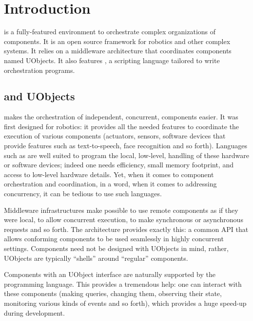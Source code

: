
\chapter{Introduction}

\usdk is a fully-featured environment to orchestrate complex organizations
of components.  It is an open source framework for robotics and other
complex systems.  It relies on a middleware architecture that coordinates
components named UObjects.  It also features \us, a scripting language
tailored to write orchestration programs.

\section{\urbi and UObjects}

\urbi makes the orchestration of independent, concurrent, components easier.
It was first designed for robotics: it provides all the needed features to
coordinate the execution of various components (actuators, sensors, software
devices that provide features such as text-to-speech, face recognition and
so forth).  Languages such as \Cxx are well suited to program the local,
low-level, handling of these hardware or software devices; indeed one needs
efficiency, small memory footprint, and access to low-level hardware
details.  Yet, when it comes to component orchestration and coordination, in
a word, when it comes to addressing concurrency, it can be tedious to use
such languages.

Middleware infrastructures make possible to use remote components as if they
were local, to allow concurrent execution, to make synchronous or
asynchronous requests and so forth.  The  \Cxx architecture
provides exactly this: a common API that allows conforming components to be
used seamlessly in highly concurrent settings.  Components need not be
designed with UObjects in mind, rather, UObjects are typically ``shells''
around ``regular'' components.

Components with an UObject interface are naturally supported by the \us
programming language.  This provides a tremendous help: one can interact
with these components (making queries, changing them, observing their state,
monitoring various kinds of events and so forth), which provides a huge
speed-up during development.


